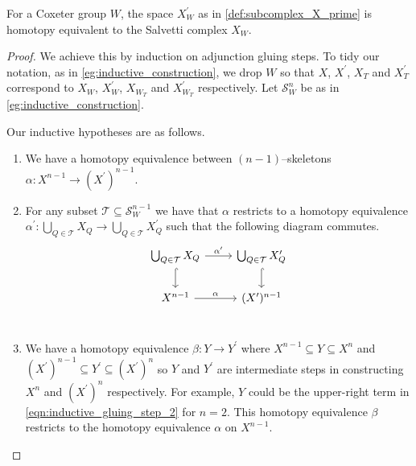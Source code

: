 \documentclass[class=article, crop=false]{standalone}
\begin{document}
\begin{theorem}
    \label{thm:salvetti_cx_equiv_X_prime}
    For a Coxeter group $W$, the space $X^\prime_W$ as in \cref{def:subcomplex_X_prime} is homotopy equivalent to the Salvetti complex $X_W$. 
\end{theorem}
\begin{proof}
    We achieve this by induction on adjunction gluing steps. To tidy our notation, as in \cref{eg:inductive_construction}, we drop $W$ so that $X$, $X^\prime$, $X_T$ and $X^\prime_T$ correspond to $X_W$, $X^\prime_W$, $X_{W_T}$ and $X^\prime_{W_T}$ respectively. Let $\mathcal{S}_W^n$ be as in \cref{eg:inductive_construction}.

    Our inductive hypotheses are as follows.

    \begin{enumerate}
        \item We have a homotopy equivalence between $(n-1)$--skeletons $\alpha \colon X^{n-1} \to (X^\prime)^{n-1}$.
        \item For any subset $\mathcal{T} \subseteq \mathcal{S}_W^{n-1}$ we have that $\alpha$ restricts to a homotopy equivalence $\alpha^\prime \colon \bigcup_{Q \in \mathcal{T}}X_Q \to \bigcup_{Q \in \mathcal{T}}X^\prime_Q$ such that the following diagram commutes.
        \begin{equation*}
            \begin{tikzcd}
    \bigcup_{Q \in \mathcal{T}} X_{Q} \ar[r, "\alpha^\prime" ] \ar[d, hookrightarrow]     &   \bigcup_{Q \in \mathcal{T}} X^\prime_{Q}  \ar[d, hookrightarrow]       \\
    X^{n-1}  \ar[r, "\alpha"]                                                                 &   (X^\prime)^{n-1}                                                  \\
            \end{tikzcd}
            \label{eqn:commutative_skeleton_inductive_hyp}  
        \end{equation*}
        \item We have a homotopy equivalence $\beta \colon Y \to Y^\prime$ where $X^{n-1} \subseteq Y \subseteq X^n$ and $(X^\prime)^{n-1} \subseteq Y^\prime \subseteq (X^\prime)^n$ so $Y$ and $Y^\prime$ are intermediate steps in constructing $X^n$ and $(X^\prime)^n$ respectively. For example, $Y$ could be the upper-right term in \eqref{eqn:inductive_gluing_step_2} for $n=2$. This homotopy equivalence $\beta$ restricts to the homotopy equivalence $\alpha$ on $X^{n-1}$.
    \end{enumerate}


\end{proof}
\end{document}
